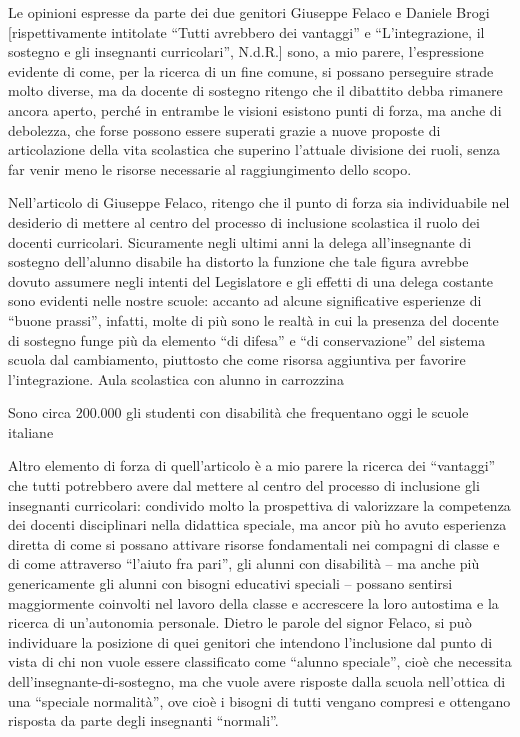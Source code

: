 Le opinioni espresse da parte dei due genitori Giuseppe Felaco\pageref{cha:felaco260413} e Daniele Brogi\pageref{brogi260413} [rispettivamente intitolate “Tutti avrebbero dei vantaggi” e “L'integrazione, il sostegno e gli insegnanti curricolari”, N.d.R.] sono, a mio parere, l'espressione evidente di come, per la ricerca di un fine comune, si possano perseguire strade molto diverse, ma da docente di sostegno ritengo che il dibattito debba rimanere ancora aperto, perché in entrambe le visioni esistono punti di forza, ma anche di debolezza, che forse possono essere superati grazie a nuove proposte di articolazione della vita scolastica che superino l'attuale divisione dei ruoli, senza far venir meno le risorse necessarie al raggiungimento dello scopo.

Nell'articolo di Giuseppe Felaco, ritengo che il punto di forza sia individuabile nel desiderio di mettere al centro del processo di inclusione scolastica il ruolo dei docenti curricolari. Sicuramente negli ultimi anni la delega all'insegnante di sostegno dell'alunno disabile ha distorto la funzione che tale figura avrebbe dovuto assumere negli intenti del Legislatore e gli effetti di una delega costante sono evidenti nelle nostre scuole: accanto ad alcune significative esperienze di “buone prassi”, infatti, molte di più sono le realtà in cui la presenza del docente di sostegno funge più da elemento “di difesa” e “di conservazione” del sistema scuola dal cambiamento, piuttosto che come risorsa aggiuntiva per favorire l'integrazione.
Aula scolastica con alunno in carrozzina

Sono circa 200.000 gli studenti con disabilità che frequentano oggi le scuole italiane

Altro elemento di forza di quell'articolo è a mio parere la ricerca dei “vantaggi” che tutti potrebbero avere dal mettere al centro del processo di inclusione gli insegnanti curricolari: condivido molto la prospettiva di valorizzare la competenza dei docenti disciplinari nella didattica speciale, ma ancor più ho avuto esperienza diretta di come si possano attivare risorse fondamentali nei compagni di classe e di come attraverso “l'aiuto fra pari”, gli alunni con disabilità – ma anche più genericamente gli alunni con bisogni educativi speciali – possano sentirsi maggiormente coinvolti nel lavoro della classe e accrescere la loro autostima e la ricerca di un'autonomia personale.
Dietro le parole del signor Felaco, si può individuare la posizione di quei genitori che intendono l'inclusione dal punto di vista di chi non vuole essere classificato come “alunno speciale”, cioè che necessita dell'insegnante-di-sostegno, ma che vuole avere risposte dalla scuola nell'ottica di una “speciale normalità”, ove cioè i bisogni di tutti vengano compresi e ottengano risposta da parte degli insegnanti “normali”.


